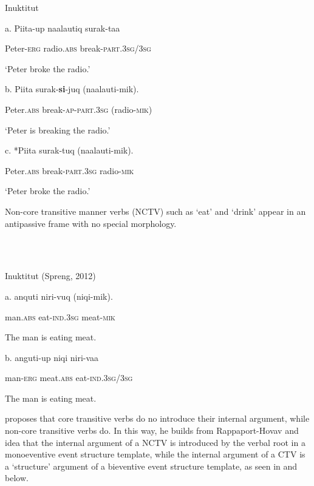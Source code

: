 \documentclass[output=paper,modfonts,nonflat]{langsci/langscibook}
\begin{document}
           Inuktitut \citep{Spreng2012}

a.   Piita-up  naalautiq  surak-taa

  Peter{}-\textsc{erg}  radio.\textsc{abs}  break-\textsc{part}.3\textsc{sg}/3\textsc{sg}

  ‘Peter broke the radio.’

b.  Piita    surak-\textbf{si}{}-juq    (naalauti-mik).

  Peter.\textsc{abs}  break-\textsc{ap}{}-\textsc{part}.3\textsc{sg}  (radio{}-\textsc{mik})

  ‘Peter is breaking the radio.’

c.   *Piita    surak-tuq    (naalauti-mik).  

  Peter.\textsc{abs}  break{}-\textsc{part}.3\textsc{sg}  radio{}-\textsc{mik}

  \textsc{‘}Peter broke the radio.’

Non-core transitive manner verbs (NCTV) such as ‘eat’ and ‘drink’ appear in an antipassive frame with no special morphology.  

\ea%
    \label{ex:key:4}
    \gll\\
        \\
    \glt
    \z

          Inuktitut (Spreng, 2012)

a.  anquti  niri-vuq  (niqi-mik).

  man.\textsc{abs}  eat{}-\textsc{ind}.3\textsc{sg}  meat{}-\textsc{mik}

  The man is eating meat.

b.  anguti-up  niqi    niri-vaa

  man{}-\textsc{erg}  meat.\textsc{abs}  eat{}-\textsc{ind}.3\textsc{sg}/3\textsc{sg}

  The man is eating meat.

\citet{Basilico2017} proposes that core transitive verbs do no introduce their internal argument, while non-core transitive verbs do.  In this way, he builds from Rappaport-Hovav and  idea that the internal argument of a NCTV is introduced by the verbal root in a monoeventive event structure template, while the internal argument of a CTV is a ‘structure’ argument of a bieventive event structure template, as seen in  and  below.

\ea%
    \label{ex:key:5}
    \gll\\
        \\
    \glt
    \z
\end{document}
